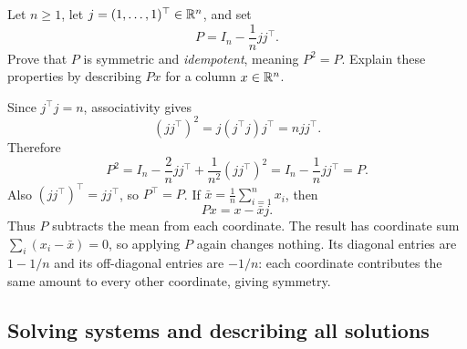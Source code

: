 \begin{problem}\label{ex:01:centering-matrix}
Let $n\geqslant1$, let $j=(1,\ldots,1)^\top\in\mathbb R^n$, and set
\[
P=I_n-\frac1n jj^\top.
\]
Prove that $P$ is symmetric and \emph{idempotent}, meaning $P^2=P$.
Explain these properties by describing $Px$ for a column $x\in\mathbb R^n$.
\end{problem}
\begin{solution}
Since $j^\top j=n$, associativity gives
\[
(jj^\top)^2=j(j^\top j)j^\top=n jj^\top.
\]
Therefore
\[
P^2=I_n-\frac2n jj^\top+\frac1{n^2}(jj^\top)^2
=I_n-\frac1n jj^\top=P.
\]
Also $(jj^\top)^\top=jj^\top$, so
$P^\top=P$.
If $\bar x=\frac1n\sum_{i=1}^n x_i$, then
\[
Px=x-\bar xj.
\]
Thus $P$ subtracts the mean from each coordinate. The result has
coordinate sum $\sum_i(x_i-\bar x)=0$, so applying $P$ again changes
nothing. Its diagonal entries are $1-1/n$ and its off-diagonal entries
are $-1/n$: each coordinate contributes the same amount to every other
coordinate, giving symmetry.
\end{solution}

\subsection*{Solving systems and describing all solutions}

